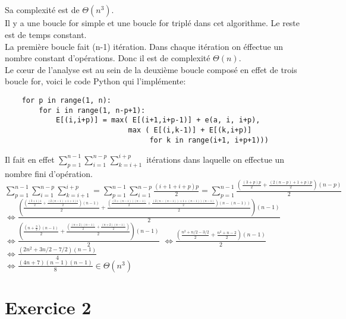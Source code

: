 \documentclass[french]{article}
\begin{document}
\subsection{}
Sa complexité est de $\Theta(n^3)$.\\
Il y a une boucle for simple et une boucle for triplé dans cet algorithme. Le reste est de temps constant.\\
La première boucle fait (n-1) itération. Dans chaque itération on éffectue un nombre constant d'opérations. Donc il est de complexité $\Theta(n)$.\\
Le cœur de l'analyse est au sein de la deuxième boucle composé en effet de trois boucle for, voici le code Python qui l'implémente:
\begin{lstlisting}
    for p in range(1, n):
        for i in range(1, n-p+1):
            E[(i,i+p)] = max( E[(i+1,i+p-1)] + e(a, i, i+p),
                             max ( E[(i,k-1)] + E[(k,i+p)]
                                  for k in range(i+1, i+p+1)))
\end{lstlisting}
Il fait en effet $\sum_{p=1}^{n-1}\sum_{i=1}^{n-p}\sum_{k=i+1}^{i+p}$ itérations dans laquelle on effectue un nombre fini d'opération.\\
$\sum_{p=1}^{n-1}\sum_{i=1}^{n-p}\sum_{k=i+1}^{i+p}=\sum_{p=1}^{n-1}\sum_{i=1}^{n-p}\frac{(i+1+i+p)p}{2}=\sum_{p=1}^{n-1}\frac{( \frac{(3+p)p}{2} + \frac{(2(n-p) + 1 + p)p}{2}) (n-p)}{2}$\\
$\Leftrightarrow \frac{
(\frac{( \frac{(3+1)1}{2} + \frac{(2(n-1) + 1 + 1)1}{2}) (n-1)}{2} + 
\frac{( \frac{(3+(n-1))(n-1)}{2} + \frac{(2(n-(n-1)) + 1 + (n-1))(n-1)}{2}) (n-(n-1))}{2})(n-1)}
{2}$\\
$\Leftrightarrow \frac{
(\frac{( n + \frac{3}{2}) (n-1)}{2} + 
\frac{( \frac{(n+2)(n-1)}{2} + \frac{(n+2)(n-1)}{2}) }{2})(n-1)}
{2}$
$\Leftrightarrow \frac{
(\frac{n^2 +  n/2 - 3/2}{2} + 
\frac{n^2 + n - 2}{2})(n-1)}
{2}$
$\Leftrightarrow \frac{
(2n^2 + 3n/2 - 7/2)(n-1)}
{4}$\\
$\Leftrightarrow \frac{
(4n+7)(n-1)(n-1)}
{8} \in \Theta(n^3) $

\section{Exercice 2}
\end{document}
